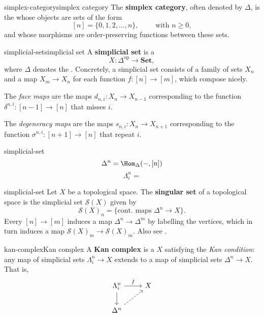 \begin{topic}{simplex-category}{simplex category}
    The \textbf{simplex category}, often denoted by $\Delta$, is the  whose objects are sets of the form
    \[ [n] = \{ 0, 1, 2, \ldots, n \}, \qquad \text{ with } n \ge 0 , \]
    and whose morphisms are order-preserving functions between these sets.
\end{topic}

\begin{topic}{simplicial-set}{simplicial set}
    A \textbf{simplicial set} is a 
    \[ X : \Delta^\text{op} \to \textbf{Set} , \]
    where $\Delta$ denotes the . Concretely, a simplicial set consists of a family of sets $X_n$ and a map $X_m \to X_n$ for each function $f : [n] \to [m]$, which compose nicely.
    
    The \textit{face maps} are the maps $d_{n, i} : X_n \to X_{n - 1}$ corresponding to the function $\delta^{n, i} : [n - 1] \to [n]$ that misses $i$.
    
    The \textit{degeneracy maps} are the maps $s_{n, i} : X_n \to X_{n + 1}$ corresponding to the function $\sigma^{n, i} : [n + 1] \to [n]$ that repeat $i$.
\end{topic}

\begin{example}{simplicial-set}
    \[ \Delta^n = \Hom_\Delta(-, [n]) \]
    \[ \Lambda^n_i =  \]
\end{example}

\begin{example}{simplicial-set}
    Let $X$ be a topological space. The \textbf{singular set} of a topological space is the simplicial set $\mathcal{S}(X)$ given by
    \[ \mathcal{S}(X)_n = \{ \text{cont. maps } \Delta^n \to X \} . \]
    Every $[n] \to [m]$ induces a map $\Delta^n \to \Delta^m$ by labelling the vertices, which in turn induces a map $\mathcal{S}(X)_m \to \mathcal{S}(X)_m$. Also see .
\end{example}

\begin{topic}{kan-complex}{Kan complex}
    A \textbf{Kan complex} is a  $X$ satisfying the \textit{Kan condition}: any map of simplicial sets $\Lambda^n_i \to X$ extends to a map of simplicial sets $\Delta^n \to X$. That is,
    \[ \begin{tikzcd} \Lambda^n_i \arrow{r}{f} \arrow{d} & X \\ \Delta^n \arrow[dashed]{ur} & \end{tikzcd} \]
\end{topic}

